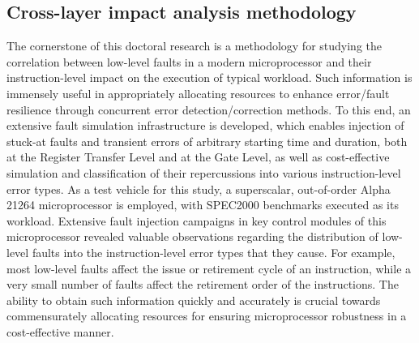 \documentclass[12pt]{yalephd}
\begin{document}
\subsection{Cross-layer impact analysis methodology} 
The cornerstone of this doctoral research is a methodology for studying the correlation between low-level faults in a modern microprocessor and their instruction-level impact on the execution of typical workload. Such information is immensely useful in appropriately allocating resources to enhance error/fault resilience through concurrent error detection/correction methods. To this end, an extensive fault simulation infrastructure is developed, which enables injection of stuck-at faults and transient errors of arbitrary starting time and duration, both at the Register Transfer Level and at the Gate Level, as well as cost-effective simulation and classification of their repercussions into various instruction-level error types. As a test vehicle for this study, a superscalar, out-of-order Alpha 21264 microprocessor is employed, with SPEC2000 benchmarks executed as its workload. Extensive fault injection campaigns in key control modules of this microprocessor revealed valuable observations regarding the distribution of low-level faults into the instruction-level error types that they cause. For example, most low-level faults affect the issue or retirement cycle of an instruction, while a very small number of faults affect the retirement order of the instructions. The ability to obtain such information quickly and accurately is crucial towards commensurately allocating resources for ensuring microprocessor robustness in a cost-effective manner.
\end{document}
